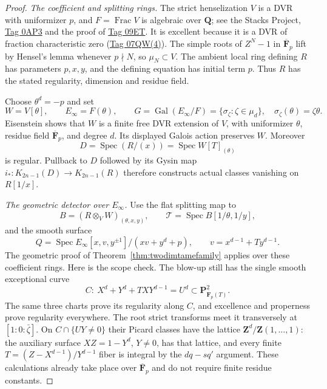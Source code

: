 \documentclass[11pt,a4paper]{article}
\theoremstyle{remark}
\newcommand{\Z}{\mathbf Z}
\newcommand{\Q}{\mathbf Q}
\newcommand{\F}{\mathbf F}
\newcommand{\Spec}{\operatorname{Spec}}
\newcommand{\Frac}{\operatorname{Frac}}
\begin{document}
\begin{proof}
\emph{The coefficient and splitting rings.}
The strict henselization $V$ is a DVR with uniformizer $p$,
and $F=\Frac V$ is algebraic over $\Q$; see the Stacks Project,
\href{https://stacks.math.columbia.edu/tag/0AP3}{Tag 0AP3}
and the proof of
\href{https://stacks.math.columbia.edu/tag/09ET}{Tag 09ET}.
It is excellent because it is a DVR of fraction characteristic
zero
(\href{https://stacks.math.columbia.edu/tag/07QW}{Tag 07QW(4)}).
The simple roots of $Z^N-1$ in $\overline{\F}_p$ lift by
Hensel's lemma whenever $p\nmid N$, so $\mu_N\subset V$.
The ambient local ring defining $R$ has parameters $p,x,y$,
and the defining equation has initial term $p$. Thus $R$ has
the stated regularity, dimension and residue field.

Choose $\theta^d=-p$ and set
\[
 W=V[\theta],\qquad E_\infty=F(\theta),\qquad
 G=\operatorname{Gal}(E_\infty/F)=\{\sigma_\zeta:\zeta\in\mu_d\},
 \quad \sigma_\zeta(\theta)=\zeta\theta .
\]
Eisenstein shows that $W$ is a finite free DVR extension of
$V$, with uniformizer $\theta$, residue field $\overline{\F}_p$,
and degree $d$. Its displayed Galois action preserves $W$.
Moreover
\[
 D=\Spec(R/(x))=\Spec W[T]_{(\theta)}
\]
is regular. Pullback to $D$ followed by its Gysin map
$i_*:K_{2n-1}(D)\to K_{2n-1}(R)$ therefore constructs
actual classes vanishing on $R[1/x]$.

\emph{The geometric detector over $E_\infty$.}
Use the flat splitting map to
\[
 B=(R\otimes_VW)_{(\theta,x,y)},\qquad
 \mathcal T=\Spec B[1/\theta,1/y],
\]
and the smooth surface
\[
 Q=\Spec E_\infty[x,v,y^{\pm1}]/(xv+y^d+p),
 \qquad v=x^{d-1}+Ty^{d-1}.
\]
The geometric proof of Theorem~\ref{thm:twodimtamefamily}
applies over these coefficient rings. Here is the scope check.
The blow-up still has the single smooth exceptional curve
\[
 C:\ X^d+Y^d+TXY^{d-1}=U^d
       \subset\mathbf P^2_{\overline{\F}_p(T)}.
\]
The same three charts prove its regularity along $C$, and
excellence and properness prove regularity everywhere. The
root strict transforms meet it transversely at
$[1:0:\bar\zeta]$. On $C\cap\{UY\ne0\}$ their Picard
classes have the lattice $\Z^d/\Z(1,\ldots,1)$:
the auxiliary surface
$XZ=1-Y^d$, $Y\ne0$, has that lattice, and every finite
$T=(Z-X^{d-1})/Y^{d-1}$ fiber is integral by the
$dq-sq'$ argument. These calculations already take place
over $\overline{\F}_p$ and do not require finite residue
constants.


\end{proof}
\end{document}
